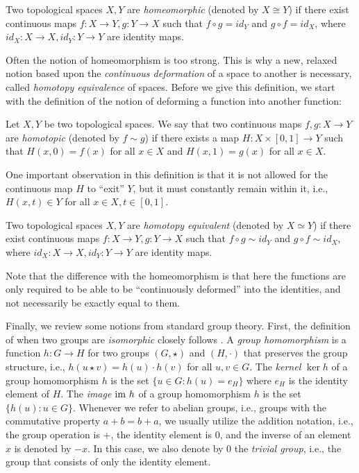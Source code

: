 \documentclass[11pt]{article}
\begin{document}
\begin{definition}
\label{def:homeo}
Two topological spaces $X, Y$ are {\em homeomorphic} (denoted by $X \cong Y$) if there exist continuous maps $f:X\to Y, g:Y\to X$ such that $f\circ g = id_Y$ and $g\circ f = id_X$, where $id_X: X\to X, id_Y: Y\to Y$ are identity maps.
\end{definition}

Often the notion of homeomorphism is too strong. This is why a new, relaxed notion based upon the {\em continuous deformation} of a space to another is necessary, called {\em homotopy equivalence} of spaces. Before we give this definition, we start with the definition of the notion of deforming a function into another function:

\begin{definition}
Let $X, Y$ be two topological spaces. We say that two continuous maps $f, g: X \to Y$ are {\em homotopic} (denoted by $f\sim g$) if there exists a map $H: X\times [0,1] \to Y$ such that $H(x, 0) = f(x)$ for all $x\in X$ and $H(x, 1) = g(x)$ for all $x\in X$.
\end{definition}

One important observation in this definition is that it is not allowed for the continuous map $H$ to ``exit'' $Y$, but it must constantly remain within it, i.e., $H(x,t)\in Y$ for all $x\in X, t\in [0,1]$.

\begin{definition}
Two topological spaces $X, Y$ are {\em homotopy equivalent} (denoted by $X \simeq Y$) if there exist continuous maps $f:X\to Y, g:Y\to X$ such that $f\circ g \sim id_Y$ and $g\circ f \sim id_X$, where $id_X: X\to X, id_Y: Y\to Y$ are identity maps.
\end{definition}

Note that the difference with the homeomorphism is that here the functions are only required to be able to be ``continuously deformed'' into the identities, and not necessarily be exactly equal to them.

Finally, we review some notions from standard group theory. First, the definition of when two groups are {\em isomorphic} closely follows . A {\em group homomorphism} is a function $h: G \to H$ for two groups $(G, \star)$ and $(H, \cdot)$ that preserves the group structure, i.e., $h(u\star v) = h(u) \cdot h(v)$ for all $u,v\in G$. The {\em kernel} $\ker h$ of a group homomorphism $h$ is the set $\{ u\in G : h(u) = e_H\}$ where $e_H$ is the identity element of $H$. The {\em image} $\text{im } h$ of a group homomorphism $h$ is the set $\{ h(u) : u\in G\}$.  Whenever we refer to abelian groups, i.e., groups with the commutative property $a + b = b + a$, we usually utilize the addition notation, i.e., the group operation is $+$, the identity element is $0$, and the inverse of an element $x$ is denoted by $-x$. In this case, we also denote by 0 the {\em trivial group}, i.e., the group that consists of only the identity element.
\end{document}

